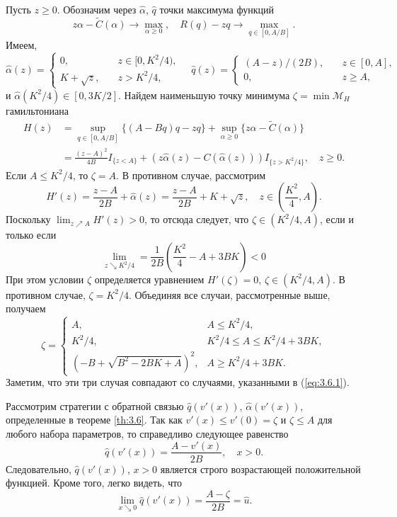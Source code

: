 Пусть $z\ge 0$. Обозначим через $\widehat\alpha$, $\widehat q$ точки максимума функций
$$ z\alpha-\widetilde C(\alpha)\to\max_{\alpha\ge 0},\quad R(q)-z q\to\max_{q\in [0,A/B]}.$$
Имеем,
\begin{equation} \label{eq:3.6.4}
\widehat\alpha(z)=\begin{cases}
    0,      &\quad z\in [0,K^2/4),\\
    K+\sqrt z, & \quad z> K^2/4,
  \end{cases}\quad
\widehat q(z)=\begin{cases}
    (A-z)/(2B),      &\quad z\in [0,A],\\
    0,       & \quad z\ge A,
  \end{cases}
\end{equation}
и $\widehat\alpha(K^2/4)\in [0,3K/2]$. Найдем наименьшую точку минимума $\zeta=\min\mathscr M_H$ гамильтониана
\begin{align*}
H(z)&=\sup_{q\in [0, A/B]}\{(A-B q) q-zq\}+\sup_{\alpha\ge 0}\{z\alpha-\widetilde C(\alpha)\}\\
 &=\frac{(z-A)^2}{4B} I_{\{z< A\}}+(z\widehat\alpha(z)-C(\widehat\alpha(z))) I_{\{z> K^2/4\}},\quad z\ge 0.
\end{align*}
Если $A\le K^2/4$, то $\zeta=A$. В противном случае, рассмотрим
$$ H'(z)=\frac{z-A}{2B}+\widehat\alpha(z)=\frac{z-A}{2B}+K+\sqrt z,\quad z\in \left(\frac{K^2}{4},A\right).$$
Поскольку $\lim_{z\nearrow A} H'(z)>0$, то отсюда следует, что $\zeta\in (K^2/4,A)$, если и только если
$$ \lim_{z\searrow K^2/4}=\frac{1}{2B}\left(\frac{K^2}{4}-A+3BK\right)<0$$
При этом условии $\zeta$ определяется уравнением $H'(\zeta)=0$, $\zeta\in (K^2/4,A)$. В противном случае, $\zeta=K^2/4$. Объединяя все случаи, рассмотренные выше, получаем
$$\zeta=\begin{cases}
A,& A\le K^2/4,\\
K^2/4,& K^2/4\le A \le K^2/4+3BK,\\
\left(-B+\sqrt{B^2-2BK+A}\right)^2,& A\ge K^2/4+3BK.
\end{cases}
$$
Заметим, что эти три случая совпадают со случаями, указанными в (\ref{eq:3.6.1}).

Рассмотрим стратегии с обратной связью $\widehat q(v'(x))$, $\widehat\alpha(v'(x))$, определенные в теореме \ref{th:3.6}. Так как $v'(x)\le v'(0)=\zeta$ и $\zeta\le A$ для любого набора параметров, то справедливо следующее равенство
$$ \widehat q(v'(x))=\frac{A-v'(x)}{2B},\quad x>0.$$
Следовательно, $\widehat q(v'(x))$, $x>0$ является строго возрастающей положительной функцией. Кроме того, легко видеть, что
$$ \lim_{x\searrow 0}\widehat q(v'(x))=\frac{A-\zeta}{2B}=\widehat u.$$

